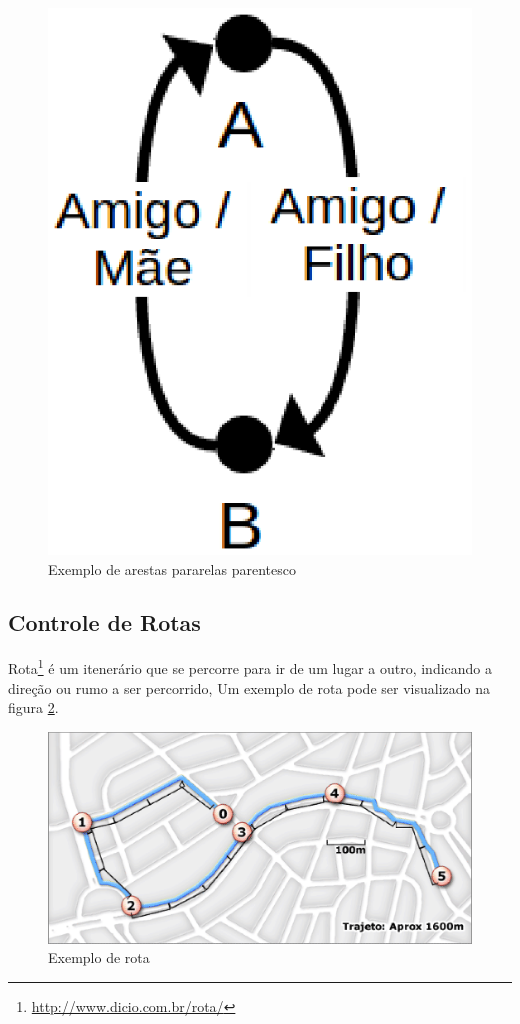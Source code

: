 \begin{figure}[!h]
	\centering
	\includegraphics[scale=0.45]{figuras/capitulo5/parentes.eps}
	\caption{Exemplo de arestas pararelas parentesco}
	\label{parentes}
\end{figure}

\subsection{Controle de Rotas}

Rota\footnote{\url{http://www.dicio.com.br/rota/}} é um itenerário que se percorre para ir de um lugar a outro, indicando a direção ou rumo a ser percorrido, Um exemplo de rota pode ser visualizado na figura \ref{rota}.

\begin{figure}[!h]
	\centering
	\includegraphics[scale=0.55]{figuras/capitulo5/rota.eps}
	\caption[Exemplo de rota]{Exemplo de rota\footnotemark}
	\label{rota}
\end{figure}

